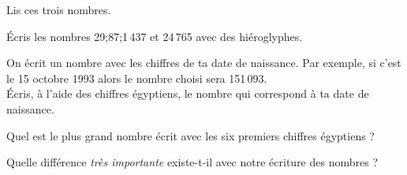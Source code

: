 \begin{myenumerate}
\item Lis ces trois nombres.
\par{\huge\pmglyph{\Hhundred-\Hhundred-\Hhundred-\Hten-\Hten-\Hten-\Hone-\Hone-\Hone-\Hone-\Hone}
\hfill
\pmglyph{\Hthousand-\Hthousand-{{\Hten-\Hten}+{\Hhundred}}-\Hone}
\hfill
\pmglyph{\Hmillion-\Hmillion-{{\HCthousand-\HCthousand}+{\Hthousand-\Hthousand-\Hthousand}}-\Hhundred-\Hten-\Hten}
}
\item \'Ecris les nombres 29;87;1\,437 et 24\,765 avec des
  hiéroglyphes.
\item On écrit un nombre avec les chiffres de ta date de
  naissance. Par exemple, si c'est le 15 octobre 1993 alors le nombre
  choisi sera 151\,093.
\\\'Ecris, à l'aide des chiffres égyptiens, le nombre qui correspond à
ta date de naissance.
\item Quel est le plus grand nombre écrit avec les six premiers
  chiffres égyptiens ?
\item Quelle différence {\em très importante} existe-t-il avec notre
  écriture des nombres ?
\end{myenumerate}